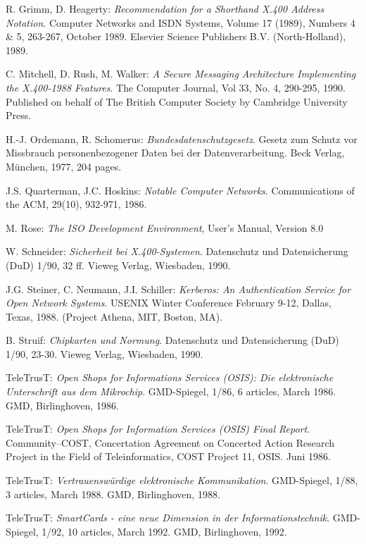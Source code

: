 \begin{thebibliography}{99}
R. Grimm, D. Heagerty:
{\em Recommendation for a Shorthand X.400 Address Notation}.
Computer Networks and ISDN Systems,
Volume 17 (1989), Numbers 4 \& 5, 263-267, October 1989.
Elsevier Science Publishers B.V. (North-Holland), 1989.

C. Mitchell, D. Rush, M. Walker:
{\em A Secure Messaging Architecture Implementing the X.400-1988 Features}.
The Computer Journal, Vol 33, No. 4, 290-295, 1990.
Published on behalf of The British Computer Society
by Cambridge University Press.

H.-J. Ordemann, R. Schomerus:
{\em Bundesdatenschutzgesetz}.
Gesetz zum Schutz vor Missbrauch personenbezogener Daten bei
der Datenverarbeitung.
Beck Verlag, M\"unchen, 1977, 204 pages.

J.S. Quarterman, J.C. Hoskins:
{\em Notable Computer Networks}.
Communications of the ACM, 29(10), 932-971, 1986.

M. Rose: {\em The ISO Development Environment}, User's Manual, Version 8.0

W. Schneider:
{\em Sicherheit bei X.400-Systemen}.
Datenschutz und Datensicherung (DuD) 1/90, 32 ff.
Vieweg Verlag, Wiesbaden, 1990.

J.G. Steiner, C. Neumann, J.I. Schiller:
{\em Kerberos: An Authentication Service for Open Network Systems}.
USENIX Winter Conference February 9-12, Dallas, Texas, 1988.
(Project Athena, MIT, Boston, MA).

B. Struif:
{\em Chipkarten und Normung}.
Datenschutz und Datensicherung (DuD) 1/90, 23-30.
Vieweg Verlag, Wiesbaden, 1990.

TeleTrusT:
{\em Open Shops for Informations Services (OSIS):
Die elektronische Unterschrift aus dem Mikrochip}.
GMD-Spiegel, 1/86, 6 articles, March 1986.
GMD, Birlinghoven, 1986.

TeleTrusT:
{\em Open Shops for Information Services (OSIS) Final Report}.
Community--COST,
Concertation Agreement on Concerted Action Research Project
in the Field of Teleinformatics,
COST Project 11, OSIS.
Juni 1986.

TeleTrusT:
{\em Vertrauensw\"urdige elektronische Kommunikation}.
GMD-Spiegel, 1/88, 3 articles, March 1988.
GMD, Birlinghoven, 1988.

TeleTrusT:
{\em SmartCards - eine neue Dimension in der Informationstechnik}.
GMD-Spiegel, 1/92, 10 articles, March 1992.
GMD, Birlinghoven, 1992.

\end{thebibliography}
